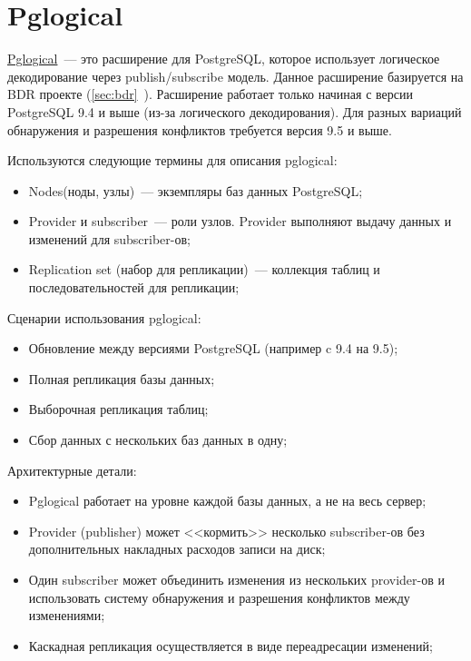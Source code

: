 \section{Pglogical}
\label{sec:pglogical}

\href{https://2ndquadrant.com/en/resources/pglogical/}{Pglogical}~--- это расширение для PostgreSQL, которое использует логическое декодирование через publish/subscribe модель. Данное расширение базируется на BDR проекте (\ref{sec:bdr}~). Расширение работает только начиная с версии PostgreSQL 9.4 и выше (из-за логического декодирования). Для разных вариаций обнаружения и разрешения конфликтов требуется версия 9.5 и выше.

Используются следующие термины для описания pglogical:

\begin{itemize}
  \item Nodes(ноды, узлы)~--- экземпляры баз данных PostgreSQL;
  \item Provider и subscriber~--- роли узлов. Provider выполняют выдачу данных и изменений для subscriber-ов;
  \item Replication set (набор для репликации)~--- коллекция таблиц и последовательностей для репликации;
\end{itemize}

Сценарии использования pglogical:

\begin{itemize}
  \item Обновление между версиями PostgreSQL (например c 9.4 на 9.5);
  \item Полная репликация базы данных;
  \item Выборочная репликация таблиц;
  \item Сбор данных с нескольких баз данных в одну;
\end{itemize}

Архитектурные детали:

\begin{itemize}
  \item Pglogical работает на уровне каждой базы данных, а не на весь сервер;
  \item Provider (publisher) может <<кормить>> несколько subscriber-ов без дополнительных накладных расходов записи на диск;
  \item Один subscriber может объединить изменения из нескольких provider-ов и использовать систему обнаружения и разрешения конфликтов между изменениями;
  \item Каскадная репликация осуществляется в виде переадресации изменений;
\end{itemize}


